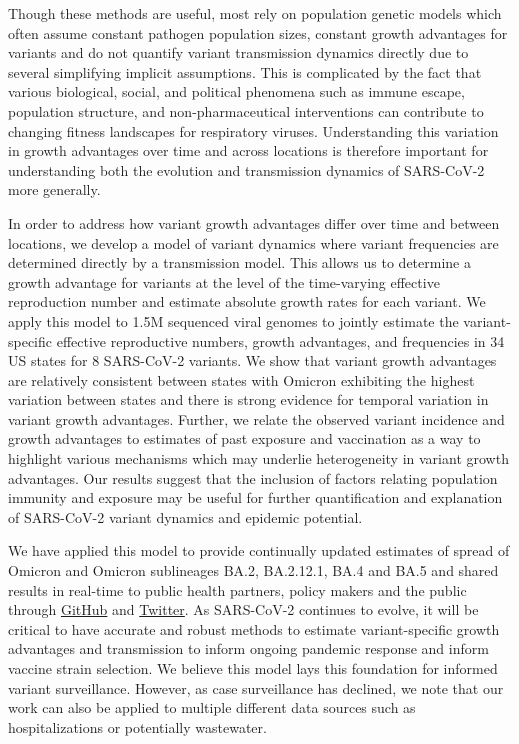 \documentclass[11pt]{article}
\begin{document}
Though these methods are useful, most rely on population genetic models which often assume constant pathogen population sizes, constant growth advantages for variants and do not quantify variant transmission dynamics directly due to several simplifying implicit assumptions.
This is complicated by the fact that various biological, social, and political phenomena such as immune escape, population structure, and non-pharmaceutical interventions can contribute to changing fitness landscapes for respiratory viruses.
Understanding this variation in growth advantages over time and across locations is therefore important for understanding both the evolution and transmission dynamics of SARS-CoV-2 more generally.

In order to address how variant growth advantages differ over time and between locations, we develop a model of variant dynamics where variant frequencies are determined directly by a transmission model.
This allows us to determine a growth advantage for variants at the level of the time-varying effective reproduction number and estimate absolute growth rates for each variant.
We apply this model to 1.5M sequenced viral genomes to jointly estimate the variant-specific effective reproductive numbers, growth advantages, and frequencies in 34 US states for 8 SARS-CoV-2 variants.
We show that variant growth advantages are relatively consistent between states with Omicron exhibiting the highest variation between states and there is strong evidence for temporal variation in variant growth advantages.
Further, we relate the observed variant incidence and growth advantages to estimates of past exposure and vaccination as a way to highlight various mechanisms which may underlie heterogeneity in variant growth advantages.
Our results suggest that the inclusion of factors relating population immunity and exposure may be useful for further quantification and explanation of SARS-CoV-2 variant dynamics and epidemic potential.

We have applied this model to provide continually updated estimates of spread of Omicron and Omicron sublineages BA.2, BA.2.12.1, BA.4 and BA.5 and shared results in real-time to public health partners, policy makers and the public through \href{https://github.com/blab/rt-from-frequency-dynamics}{GitHub} and \href{https://twitter.com/trvrb/status/1530649628625936384}{Twitter}.
As SARS-CoV-2 continues to evolve, it will be critical to have accurate and robust methods to estimate variant-specific growth advantages and transmission to inform ongoing pandemic response and inform vaccine strain selection.
We believe this model lays this foundation for informed variant surveillance.
However, as case surveillance has declined, we note that our work can also be applied to multiple different data sources such as hospitalizations or potentially wastewater.
\end{document}
